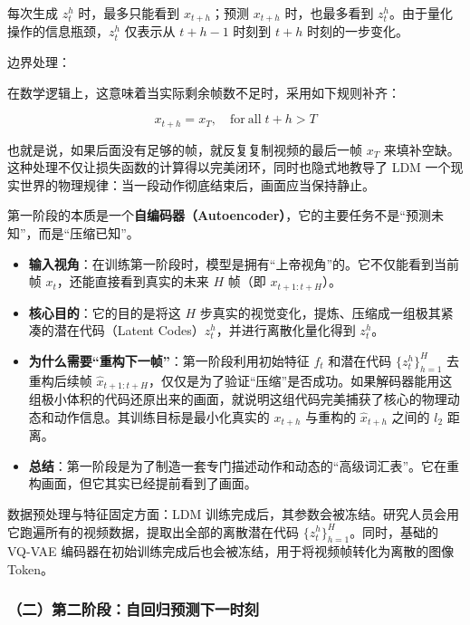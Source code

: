 每次生成 \(z_t^h\) 时，最多只能看到 \(x_{t+h}\)；预测 \(x_{t+h}\) 时，也最多看到 \(z_t^h\)。由于量化操作的信息瓶颈，\(z_t^h\) 仅表示从 \(t+h-1\) 时刻到 \(t+h\) 时刻的一步变化。

边界处理：

在数学逻辑上，这意味着当实际剩余帧数不足时，采用如下规则补齐：

\[
x_{t+h} = x_T,\quad \mathrm{for\ all}\; t+h \gt T
\]

也就是说，如果后面没有足够的帧，就反复复制视频的最后一帧 \(x_T\) 来填补空缺。这种处理不仅让损失函数的计算得以完美闭环，同时也隐式地教导了 LDM 一个现实世界的物理规律：当一段动作彻底结束后，画面应当保持静止。

第一阶段的本质是一个\textbf{自编码器（Autoencoder）}，它的主要任务不是``预测未知''，而是``压缩已知''。

\begin{itemize}
\tightlist
\item
  \textbf{输入视角}：在训练第一阶段时，模型是拥有``上帝视角''的。它不仅能看到当前帧 \(x_t\)，还能直接看到真实的未来 \(H\) 帧（即 \(x_{t+1:t+H}\)）。
\item
  \textbf{核心目的}：它的目的是将这 \(H\) 步真实的视觉变化，提炼、压缩成一组极其紧凑的潜在代码（Latent Codes）\(z_t^h\)，并进行离散化量化得到 \(z_t^h\)。
\item
  \textbf{为什么需要``重构下一帧''}：第一阶段利用初始特征 \(f_t\) 和潜在代码 \(\{z_t^h\}_{h=1}^H\) 去重构后续帧 \(\hat{x}_{t+1:t+H}\)，仅仅是为了验证``压缩''是否成功。如果解码器能用这组极小体积的代码还原出来的画面，就说明这组代码完美捕获了核心的物理动态和动作信息。其训练目标是最小化真实的 \(x_{t+h}\) 与重构的 \(\hat{x}_{t+h}\) 之间的 \(l_2\) 距离。
\item
  \textbf{总结}：第一阶段是为了制造一套专门描述动作和动态的``高级词汇表''。它在重构画面，但它其实已经提前看到了画面。
\end{itemize}

数据预处理与特征固定方面：LDM 训练完成后，其参数会被冻结。研究人员会用它跑遍所有的视频数据，提取出全部的离散潜在代码 \(\{z_t^h\}_{h=1}^H\)。同时，基础的 VQ-VAE 编码器在初始训练完成后也会被冻结，用于将视频帧转化为离散的图像 Token。

\hypertarget{ux4e8cux7b2cux4e8cux9636ux6bb5ux81eaux56deux5f52ux9884ux6d4bux4e0bux4e00ux65f6ux523b}{%
\subsubsection{（二）第二阶段：自回归预测下一时刻}\label{ux4e8cux7b2cux4e8cux9636ux6bb5ux81eaux56deux5f52ux9884ux6d4bux4e0bux4e00ux65f6ux523b}}

